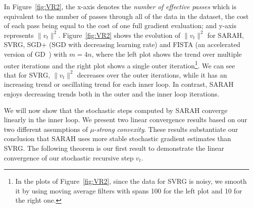 \documentclass{article}
\newcommand{\tc}[1]{\textcolor{Magenta}{\bf #1}}
\begin{document}
In Figure~\ref{fig:VR2}, the x-axis  denotes the  \emph{number of effective passes} which is equivalent to the  number of passes through all of the data in the dataset, the cost of each pass being  equal to the cost of one full gradient evaluation; and y-axis represents $\|v_t\|^2$.
Figure~\ref{fig:VR2} shows the evolution of  $\|v_t\|^2$ for SARAH, SVRG, SGD+ (SGD with decreasing learning rate) and FISTA (an accelerated version of  GD~\cite{fista}) with $m=4n$, %
where the left plot shows the trend over multiple outer iterations and the right plot shows a single outer iteration\footnote{In the plots of Figure~\ref{fig:VR2}, since the data for SVRG is noisy, we smooth it by using moving average filters with spans 100 for the left plot and 10 for the right one.}. We can see that for SVRG, $\|v_t\|^2$  decreases over the outer iterations, while it has an increasing trend or oscillating trend for each inner loop. In contrast, SARAH enjoys decreasing trends both in the outer  and the inner loop iterations.

We will now show that the stochastic steps computed by SARAH converge linearly in the inner loop.  We present two linear convergence results  based on our two different assumptions of $\mu$-\emph{strong convexity}. These results substantiate our conclusion that SARAH  uses more stable stochastic gradient estimates than SVRG. The following theorem is our first result to demonstrate the linear convergence of our stochastic recursive step $v_t$.
\end{document}
